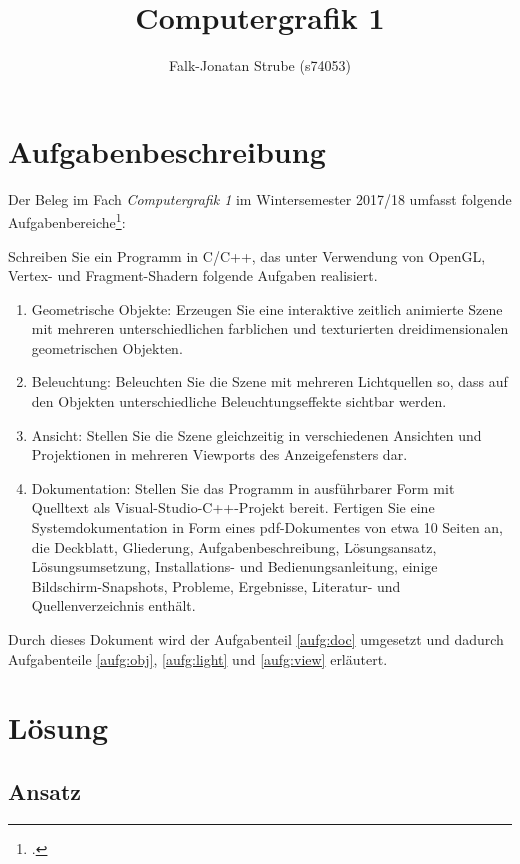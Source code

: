 \documentclass{scrreprt}
\title{Computergrafik 1}
\author{Falk-Jonatan Strube (s74053)}
\begin{document}
\maketitle
\tableofcontents

\chapter{Aufgabenbeschreibung}

Der Beleg im Fach \emph{Computergrafik 1} im Wintersemester 2017/18 umfasst folgende Aufgabenbereiche\footcite{Oertel2017}:\bigskip

Schreiben Sie ein Programm in C/C++, das unter Verwendung von OpenGL, Vertex- und
Fragment-Shadern folgende Aufgaben realisiert.
\begin{enumerate}
\item \label{aufg:obj} Geometrische Objekte: Erzeugen Sie eine interaktive zeitlich animierte Szene mit mehreren unterschiedlichen farblichen und texturierten dreidimensionalen geometrischen Objekten.
\item \label{aufg:light} Beleuchtung: Beleuchten Sie die Szene mit mehreren Lichtquellen so, dass auf den Objekten unterschiedliche Beleuchtungseffekte sichtbar werden.
\item \label{aufg:view} Ansicht: Stellen Sie die Szene gleichzeitig in verschiedenen Ansichten und Projektionen in mehreren Viewports des Anzeigefensters dar.
\item \label{aufg:doc} Dokumentation: Stellen Sie das Programm in ausführbarer Form mit Quelltext als Visual-Studio-C++-Projekt bereit. Fertigen Sie eine Systemdokumentation in Form eines pdf-Dokumentes von etwa 10 Seiten an, die Deckblatt, Gliederung, Aufgabenbeschreibung, Lösungsansatz, Lösungsumsetzung, Installations- und Bedienungsanleitung, einige Bild\-schirm-Snapshots, Probleme, Ergebnisse, Literatur- und Quellenverzeichnis enthält.
\end{enumerate}

Durch dieses Dokument wird der Aufgabenteil \ref{aufg:doc} umgesetzt und dadurch Aufgabenteile \ref{aufg:obj}, \ref{aufg:light} und \ref{aufg:view} erläutert.

\chapter{Lösung}

\section{Ansatz}
\end{document}
